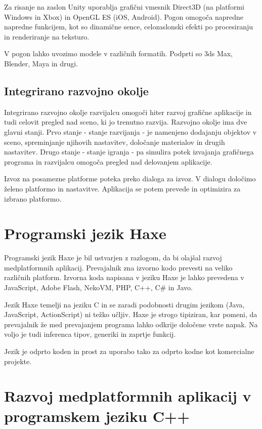 Za risanje na zaslon Unity uporablja grafični vmesnik Direct3D (na platformi Windows in Xbox) in OpenGL ES (iOS, Android). Pogon omogoča napredne napredne funkcijem, kot so dinamične sence, celozaslonski efekti po procesiranju in renderiranje na teksturo. 

V pogon lahko uvozimo modele v različnih formatih. Podprti so 3ds Max, Blender, Maya in drugi. 

\subsection{Integrirano razvojno okolje} 

Integrirano razvojno okolje razvijalcu omogoči hiter razvoj grafične aplikacije in tudi celovit pregled nad sceno, ki jo trenutno razvija. Razvojno okolje ima dve glavni stanji. Prvo stanje - stanje razvijanja - je namenjeno dodajanju objektov v sceno, spreminjanje njihovih nastavitev, določanje materialov in drugih nastavitev. Drugo stanje - stanje igranja - pa simulira potek izvajanja grafičnega programa in razvijalcu omogoča pregled nad delovanjem aplikacije. 

Izvoz na posamezne platforme poteka preko dialoga za izvoz. V dialogu določimo želeno platformo in nastavitve. Aplikacija se potem prevede in optimizira za izbrano platformo.


\section{Programski jezik Haxe}
\label{sec:haxe}

Programski jezik Haxe \cite{haxe} je bil ustvarjen z razlogom, da bi olajšal razvoj medplatformnih aplikacij. Prevajalnik zna izvorno kodo prevesti na veliko različnih platform. Izvorna koda napisana v jeziku Haxe je lahko prevedena v JavaScript, Adobe Flash, NekoVM, PHP, C++, C\# in Javo.

Jezik Haxe temelji na jeziku C in se zaradi podobnosti drugim jezikom (Java, JavaScript, ActionScript) ni težko učljiv. Haxe je strogo tipiziran, kar pomeni, da prevajalnik že med prevajanjem programa lahko odkrije določene vrste napak. Na voljo je tudi inferenca tipov, generiki in zaprtje funkcij. 

Jezik je odprto koden in prost za uporabo tako za odprto kodne kot komercialne projekte.

\section{Razvoj medplatformnih aplikacij v programskem jeziku C++}

